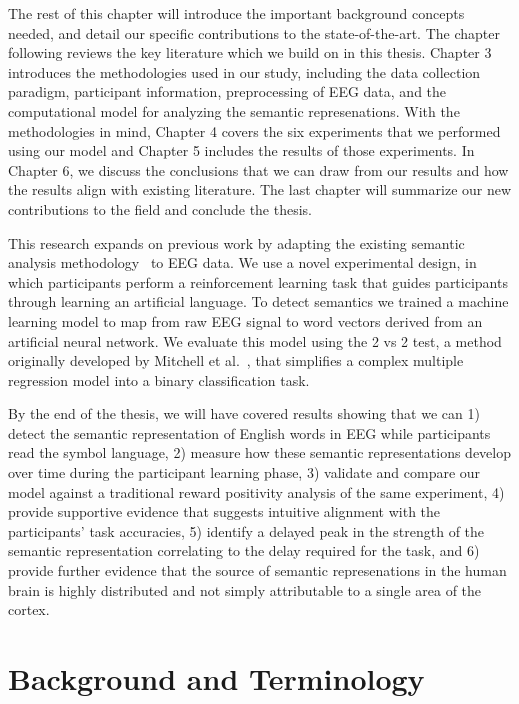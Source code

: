 The rest of this chapter will introduce the important background concepts 
needed, and detail our specific contributions to the state-of-the-art. The 
chapter following reviews the key literature which we build on in this thesis.  
Chapter 3 introduces the methodologies used in our study, including the data 
collection paradigm, participant information, preprocessing of EEG data, and 
the computational model for analyzing the semantic represenations. With the 
methodologies in mind, Chapter 4 covers the six experiments that we performed 
using our model and Chapter 5 includes the results of those experiments. In 
Chapter 6, we discuss the conclusions that we can draw from our results and how 
the results align with existing literature. The last chapter will summarize our 
new contributions to the field and conclude the thesis.

This research expands on previous work by adapting the existing semantic 
analysis methodology~\cite{Mitchell2008,Sudre2012} to EEG data.  We use a novel 
experimental design, in which participants perform a reinforcement learning 
task that guides participants through learning an artificial language. To 
detect semantics we trained a machine learning model to map from raw EEG signal 
to word vectors derived from an artificial neural network. We evaluate this 
model using the 2 vs 2 test, a method originally developed by Mitchell et 
al.~\cite{Mitchell2008}, that simplifies a complex multiple regression model 
into a binary classification task.

By the end of the thesis, we will have covered results showing that we can 1) 
detect the semantic representation of English words in EEG while participants 
read the symbol language, 2) measure how these semantic representations develop 
over time during the participant learning phase, 3) validate and compare our 
model against a traditional reward positivity analysis of the same experiment, 
4) provide supportive evidence that suggests intuitive alignment with the 
participants' task accuracies, 5) identify a delayed peak in the strength of 
the semantic representation correlating to the delay required for the task, and 
6) provide further evidence that the source of semantic represenations in the 
human brain is highly distributed and not simply attributable to a single area 
of the cortex.

\section{Background and Terminology}

